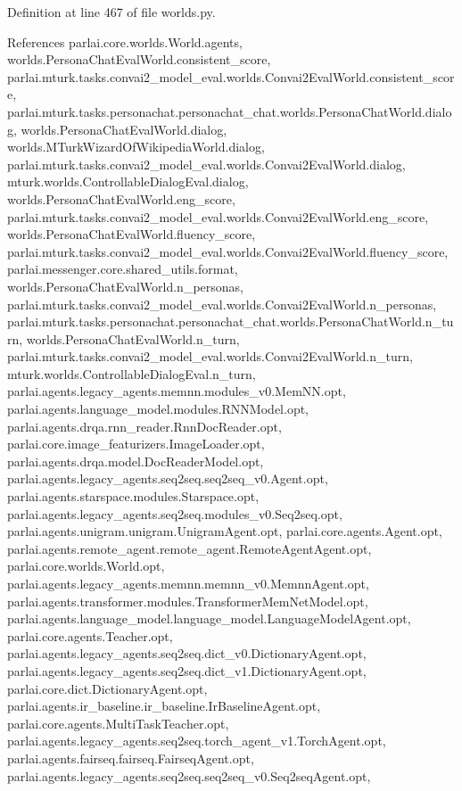 Definition at line 467 of file worlds.\+py.



References parlai.\+core.\+worlds.\+World.\+agents, worlds.\+Persona\+Chat\+Eval\+World.\+consistent\+\_\+score, parlai.\+mturk.\+tasks.\+convai2\+\_\+model\+\_\+eval.\+worlds.\+Convai2\+Eval\+World.\+consistent\+\_\+score, parlai.\+mturk.\+tasks.\+personachat.\+personachat\+\_\+chat.\+worlds.\+Persona\+Chat\+World.\+dialog, worlds.\+Persona\+Chat\+Eval\+World.\+dialog, worlds.\+M\+Turk\+Wizard\+Of\+Wikipedia\+World.\+dialog, parlai.\+mturk.\+tasks.\+convai2\+\_\+model\+\_\+eval.\+worlds.\+Convai2\+Eval\+World.\+dialog, mturk.\+worlds.\+Controllable\+Dialog\+Eval.\+dialog, worlds.\+Persona\+Chat\+Eval\+World.\+eng\+\_\+score, parlai.\+mturk.\+tasks.\+convai2\+\_\+model\+\_\+eval.\+worlds.\+Convai2\+Eval\+World.\+eng\+\_\+score, worlds.\+Persona\+Chat\+Eval\+World.\+fluency\+\_\+score, parlai.\+mturk.\+tasks.\+convai2\+\_\+model\+\_\+eval.\+worlds.\+Convai2\+Eval\+World.\+fluency\+\_\+score, parlai.\+messenger.\+core.\+shared\+\_\+utils.\+format, worlds.\+Persona\+Chat\+Eval\+World.\+n\+\_\+personas, parlai.\+mturk.\+tasks.\+convai2\+\_\+model\+\_\+eval.\+worlds.\+Convai2\+Eval\+World.\+n\+\_\+personas, parlai.\+mturk.\+tasks.\+personachat.\+personachat\+\_\+chat.\+worlds.\+Persona\+Chat\+World.\+n\+\_\+turn, worlds.\+Persona\+Chat\+Eval\+World.\+n\+\_\+turn, parlai.\+mturk.\+tasks.\+convai2\+\_\+model\+\_\+eval.\+worlds.\+Convai2\+Eval\+World.\+n\+\_\+turn, mturk.\+worlds.\+Controllable\+Dialog\+Eval.\+n\+\_\+turn, parlai.\+agents.\+legacy\+\_\+agents.\+memnn.\+modules\+\_\+v0.\+Mem\+N\+N.\+opt, parlai.\+agents.\+language\+\_\+model.\+modules.\+R\+N\+N\+Model.\+opt, parlai.\+agents.\+drqa.\+rnn\+\_\+reader.\+Rnn\+Doc\+Reader.\+opt, parlai.\+core.\+image\+\_\+featurizers.\+Image\+Loader.\+opt, parlai.\+agents.\+drqa.\+model.\+Doc\+Reader\+Model.\+opt, parlai.\+agents.\+legacy\+\_\+agents.\+seq2seq.\+seq2seq\+\_\+v0.\+Agent.\+opt, parlai.\+agents.\+starspace.\+modules.\+Starspace.\+opt, parlai.\+agents.\+legacy\+\_\+agents.\+seq2seq.\+modules\+\_\+v0.\+Seq2seq.\+opt, parlai.\+agents.\+unigram.\+unigram.\+Unigram\+Agent.\+opt, parlai.\+core.\+agents.\+Agent.\+opt, parlai.\+agents.\+remote\+\_\+agent.\+remote\+\_\+agent.\+Remote\+Agent\+Agent.\+opt, parlai.\+core.\+worlds.\+World.\+opt, parlai.\+agents.\+legacy\+\_\+agents.\+memnn.\+memnn\+\_\+v0.\+Memnn\+Agent.\+opt, parlai.\+agents.\+transformer.\+modules.\+Transformer\+Mem\+Net\+Model.\+opt, parlai.\+agents.\+language\+\_\+model.\+language\+\_\+model.\+Language\+Model\+Agent.\+opt, parlai.\+core.\+agents.\+Teacher.\+opt, parlai.\+agents.\+legacy\+\_\+agents.\+seq2seq.\+dict\+\_\+v0.\+Dictionary\+Agent.\+opt, parlai.\+agents.\+legacy\+\_\+agents.\+seq2seq.\+dict\+\_\+v1.\+Dictionary\+Agent.\+opt, parlai.\+core.\+dict.\+Dictionary\+Agent.\+opt, parlai.\+agents.\+ir\+\_\+baseline.\+ir\+\_\+baseline.\+Ir\+Baseline\+Agent.\+opt, parlai.\+core.\+agents.\+Multi\+Task\+Teacher.\+opt, parlai.\+agents.\+legacy\+\_\+agents.\+seq2seq.\+torch\+\_\+agent\+\_\+v1.\+Torch\+Agent.\+opt, parlai.\+agents.\+fairseq.\+fairseq.\+Fairseq\+Agent.\+opt, parlai.\+agents.\+legacy\+\_\+agents.\+seq2seq.\+seq2seq\+\_\+v0.\+Seq2seq\+Agent.\+opt, 